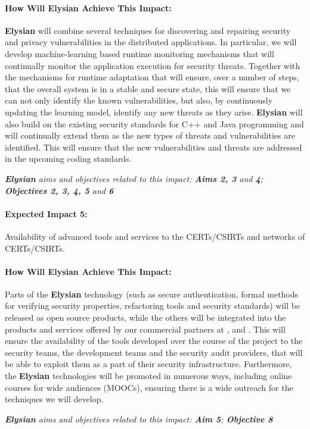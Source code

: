 \documentclass[a4paper,11pt]{article}
\newcommand{\project}[1]{\textbf{#1}\xspace}
\newcommand{\SECURITY}{\project{Elysian}}
\newcommand{\TheProject}{\SECURITY}
\begin{document}
\begin{mdframed}[backgroundcolor=gray!10]
\paragraph{How Will \TheProject{} Achieve This Impact:}
\TheProject{} will combine several techniques for discovering and repairing security and privacy vulnerabilities in the distributed applications. In particular, we will develop machine-learning based runtime monitoring mechanisms that will continually monitor the application execution for security threats. Together with the mechanisms for runtime adaptation that will ensure, over a number of steps, that the overall system is in a stable and secure state, this will ensure that we can not only identify the known vulnerabilities, but also, by continuously updating the learning model, identify any new threats as they arise. \TheProject{} will also build on the existing security standards for C++ and Java programming and will continually extend them as the new types of threats and vulnerabilities are identified. This will ensure that the new vulnerabilities and threats are addressed in the upcoming coding standards. 

\emph{\TheProject{} aims and objectives related to this impact: \textbf{Aims 2, 3}  and \textbf{4}; \textbf{Objectives 2, 3, 4, 5} and \textbf{6} }


\end{mdframed}

\begin{mdframed}[backgroundcolor=blue!5]
\paragraph{Expected Impact 5:}
Availability of advanced tools and services to the CERTs/CSIRTs and networks of CERTs/CSIRTs.
\end{mdframed}

\begin{mdframed}[backgroundcolor=gray!10]
\paragraph{How Will \TheProject{} Achieve This Impact:}
Parts of the \TheProject{} technology (such as secure authentication, formal methods for verifying security properties, refactoring tools and security standards) will be released as open source products, while the others will be integrated into the products and services offered by our commercial partners at \IBMshort{}, \YAGshort{} and \SOPRAshort{}. This will ensure the availability of the tools developed over the course of the project to the security teams, the development teams and the security audit providers, that will be able to exploit them as a part of their security infrastructure. Furthermore, the \TheProject{} technologies will be promoted in numerous ways, including online courses for wide audiences (MOOCs), ensuring there is a wide outreach for the techniques we will develop.

\emph{\TheProject{} aims and objectives related to this impact: \textbf{Aim 5}; \textbf{Objective 8} }

\end{mdframed}
\end{document}

